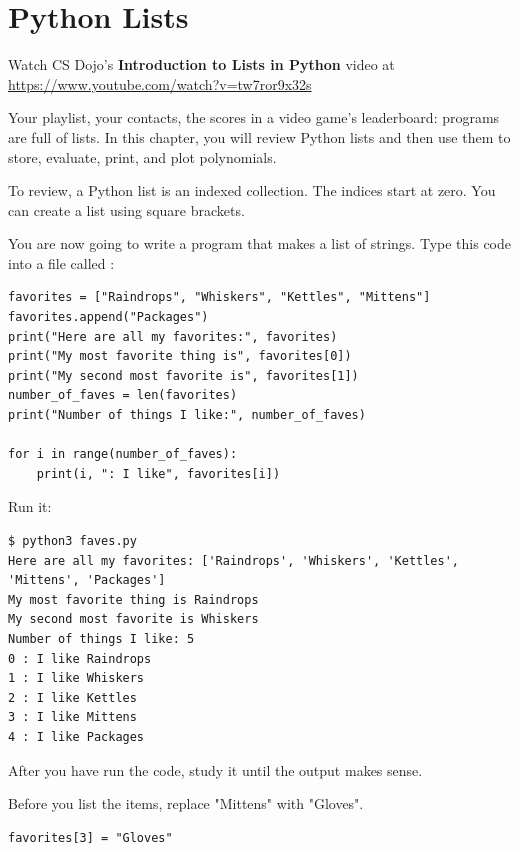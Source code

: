 \chapter{Python Lists}

Watch CS Dojo's \textbf{Introduction to Lists in Python} video at \url{https://www.youtube.com/watch?v=tw7ror9x32s}

Your playlist, your contacts, the scores in a video game's leaderboard:
programs are full of lists. In this chapter, you will review Python lists
and then use them to store, evaluate, print, and plot polynomials.

To review, a Python list is an indexed collection. The indices start at
zero. You can create a list using square brackets.

You are now going to write a program that makes a list of
strings. Type this code into a file called :

\begin{verbatim}
favorites = ["Raindrops", "Whiskers", "Kettles", "Mittens"]
favorites.append("Packages")
print("Here are all my favorites:", favorites)
print("My most favorite thing is", favorites[0])
print("My second most favorite is", favorites[1])
number_of_faves = len(favorites)
print("Number of things I like:", number_of_faves)

for i in range(number_of_faves):
    print(i, ": I like", favorites[i])
\end{verbatim}

Run it:
\begin{verbatim}
$ python3 faves.py
Here are all my favorites: ['Raindrops', 'Whiskers', 'Kettles', 'Mittens', 'Packages']
My most favorite thing is Raindrops
My second most favorite is Whiskers
Number of things I like: 5
0 : I like Raindrops
1 : I like Whiskers
2 : I like Kettles
3 : I like Mittens
4 : I like Packages
\end{verbatim}
After you have run the code, study it until the output makes sense.

\begin{Exercise}[title={Assign into list}, label=assignintolist]
  Before you list the items, replace "Mittens" with "Gloves".
\end{Exercise}
\begin{Answer}[ref=assignintolist]
\begin{verbatim}
favorites[3] = "Gloves"
\end{verbatim}
\end{Answer}


